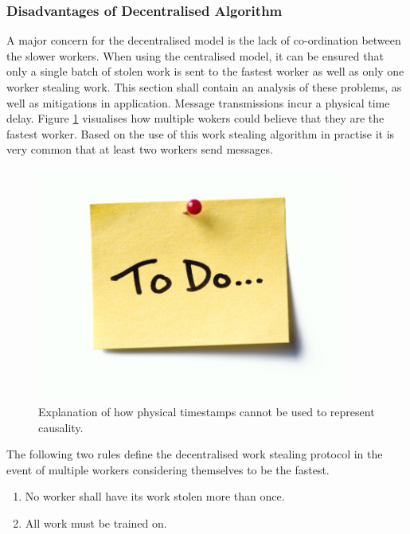 \documentclass[12pt]{article}
\begin{document}
\subsubsection{Disadvantages of Decentralised Algorithm}
A major concern for the decentralised model is the lack of co-ordination between the slower workers. When using the centralised model, it can be ensured that only a single batch of stolen work is sent to the fastest worker as well as only one worker stealing work. This section shall contain an analysis of these problems, as well as mitigations in application.
\newline
\newline
Message transmissions incur a physical time delay. Figure \ref{messageInterleave} visualises how multiple wokers could believe that they are the fastest worker. Based on the use of this work stealing algorithm in practise it is very common that at least two workers send  messages.

\begin{figure}[H]
  \centering
  \includegraphics[width=4in]{todo}
  \caption[]{Explanation of how physical timestamps cannot be used to represent causality.}
  \label{messageInterleave}
\end{figure}

The following two rules define the decentralised work stealing protocol in the event of multiple workers considering themselves to be the fastest.

\begin{enumerate}
\item No worker shall have its work stolen more than once.
\item All work must be trained on.
\end{enumerate}
\end{document}
